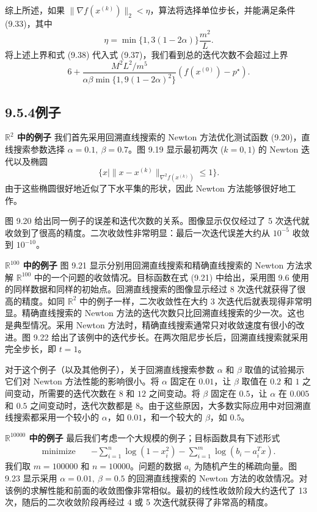 \documentclass[UTF8,12pt,a4paper,fontset=fandol]{ctexart}
\begin{document}
综上所述，如果 $\|\nabla f(x^{(k)})\|_2<\eta$，算法将选择单位步长，并能满足条件 (9.33)，其中
\[
\eta=\min\{1,3(1-2\alpha)\}\frac{m^2}{L}.
\]
将上述上界和式 (9.38) 代入式 (9.37)，我们看到总的迭代次数不会超过上界
\begin{equation}
6+\frac{M^2L^2/m^5}{\alpha\beta\min\{1,9(1-2\alpha)^2\}}(f(x^{(0)})-p^\star).
\tag{9.40}
\end{equation}

\subsection*{9.5.4\quad 例子}

\noindent\textbf{$\mathbb{R}^2$ 中的例子}\quad
我们首先采用回溯直线搜索的 Newton 方法优化测试函数 (9.20)，直线搜索参数选择 $\alpha=0.1,\ \beta=0.7$。图 9.19 显示最初两次 ($k=0,1$) 的 Newton 迭代以及椭圆
\[
\{x\mid \|x-x^{(k)}\|_{\nabla^2f(x^{(k)})}\leq1\}.
\]
由于这些椭圆很好地近似了下水平集的形状，因此 Newton 方法能够很好地工作。

图 9.20 给出同一例子的误差和迭代次数的关系。图像显示仅仅经过了 5 次迭代就收敛到了很高的精度。二次收敛性非常明显：最后一次迭代误差大约从 $10^{-5}$ 收敛到 $10^{-10}$。

\noindent\textbf{$\mathbb{R}^{100}$ 中的例子}\quad
图 9.21 显示分别用回溯直线搜索和精确直线搜索的 Newton 方法求解 $\mathbb{R}^{100}$ 中的一个问题的收敛情况。目标函数在式 (9.21) 中给出，采用图 9.6 使用的同样数据和同样的初始点。回溯直线搜索的图像显示经过 8 次迭代就获得了很高的精度。如同 $\mathbb{R}^2$ 中的例子一样，二次收敛性在大约 3 次迭代后就表现得非常明显。精确直线搜索的 Newton 方法的迭代次数只比回溯直线搜索的少一次。这也是典型情况。采用 Newton 方法时，精确直线搜索通常只对收敛速度有很小的改进。图 9.22 给出了该例中的迭代步长。在两次阻尼步长后，回溯直线搜索就采用完全步长，即 $t=1$。

对于这个例子（以及其他例子），关于回溯直线搜索参数 $\alpha$ 和 $\beta$ 取值的试验揭示它们对 Newton 方法性能的影响很小。将 $\alpha$ 固定在 $0.01$，让 $\beta$ 取值在 $0.2$ 和 $1$ 之间变动，所需要的迭代次数在 $8$ 和 $12$ 之间变动。将 $\beta$ 固定在 $0.5$，让 $\alpha$ 在 $0.005$ 和 $0.5$ 之间变动时，迭代次数都是 $8$。由于这些原因，大多数实际应用中对回溯直线搜索都采用一个较小的 $\alpha$，如 $0.01$，和一个较大的 $\beta$，如 $0.5$。

\noindent\textbf{$\mathbb{R}^{10000}$ 中的例子}\quad
最后我们考虑一个大规模的例子；目标函数具有下述形式
\[
\begin{aligned}
\text{minimize}\quad & -\sum_{i=1}^n\log(1-x_i^2)-\sum_{i=1}^m\log(b_i-a_i^Tx).
\end{aligned}
\]
我们取 $m=100000$ 和 $n=10000$。问题的数据 $a_i$ 为随机产生的稀疏向量。图 9.23 显示采用 $\alpha=0.01,\ \beta=0.5$ 的回溯直线搜索的 Newton 方法的收敛情况。对该例的求解性能和前面的收敛图像非常相似。最初的线性收敛阶段大约迭代了 13 次，随后的二次收敛阶段再经过 4 或 5 次迭代就获得了非常高的精度。
\end{document}
